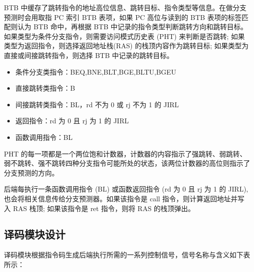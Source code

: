 BTB 中缓存了跳转指令的地址高位信息、跳转目标、指令类型等信息。在做分支预测时会用取指 PC 索引 BTB 表项，如果 PC 高位与读到的 BTB 表项的标签匹配则认为 BTB 命中，再根据 BTB 中记录的指令类型判断跳转方向和跳转目标。如果类型为条件分支指令，则需要访问模式历史表 (PHT) 来判断是否跳转; 如果类型为返回指令，则选择返回地址栈(RAS) 的栈顶内容作为跳转目标; 如果类型为直接或间接跳转指令，则选择 BTB 中记录的跳转目标。

\begin{itemize}
\item
  条件分支类指令：BEQ,BNE,BLT,BGE,BLTU,BGEU
\item
  直接跳转类指令：B
\item
  间接跳转类指令：BL，rd 不为 0 或 rj 不为 1 的 JIRL
\item
  返回指令：rd 为 0 且 rj 为 1 的 JIRL
\item
  函数调用指令：BL
\end{itemize}

PHT 的每一项都是一个两位饱和计数器，计数器的内容指示了强跳转、弱跳转、弱不跳转、强不跳转四种分支指令可能所处的状态，该两位计数器的高位则指示了分支预测的方向。

后端每执行一条函数调用指令 (BL) 或函数返回指令 (rd 为 0 且 rj 为 1 的 JIRL), 也会将相关信息传给分支预测器。如果该指令是 call 指令，则计算返回地址并写入 RAS 栈顶; 如果该指令是 ret 指令，则将 RAS 的栈顶弹出。

\subsection{译码模块设计}\label{sec:03-base-cpu-003}

译码模块根据指令码生成后端执行所需的一系列控制信号，信号名称与含义如下表所示：

